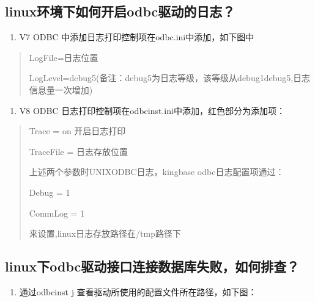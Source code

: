 \documentclass[a4,10pt,oneside,english]{sphinxmanual}
\begin{document}
\subsection{linux环境下如何开启odbc驱动的日志？}
\label{\detokenize{interface/odbc:linuxodbc}}\begin{enumerate}
%
\item {} 
V7 ODBC 中添加日志打印控制项在odbc.ini中添加，如下图中

\end{enumerate}
\begin{quote}

\begin{figure}[H]
\centering

\noindent{}
\end{figure}

LogFile=日志位置

LogLevel=debug5(备注：debug5为日志等级，该等级从debug1\sphinxhyphen{}\sphinxhyphen{}\sphinxhyphen{}debug5,日志信息量一次增加)
\end{quote}
\begin{enumerate}
%
\setcounter{enumi}{1}
\item {} 
V8 ODBC 日志打印控制项在odbcinst.ini中添加，红色部分为添加项：

\end{enumerate}
\begin{quote}

\begin{figure}[H]
\centering

\noindent{}
\end{figure}

Trace = on 开启日志打印

TraceFile = 日志存放位置

上述两个参数时UNIXODBC日志，kingbase odbc日志配置项通过：

Debug = 1

CommLog = 1

来设置,linux日志存放路径在/tmp路径下
\end{quote}


\subsection{linux下odbc驱动接口连接数据库失败，如何排查？}
\label{\detokenize{interface/odbc:id2}}\begin{enumerate}
%
\item {} 
通过odbcinst \sphinxhyphen{}j 查看驱动所使用的配置文件所在路径，如下图：

\end{enumerate}
\end{document}
